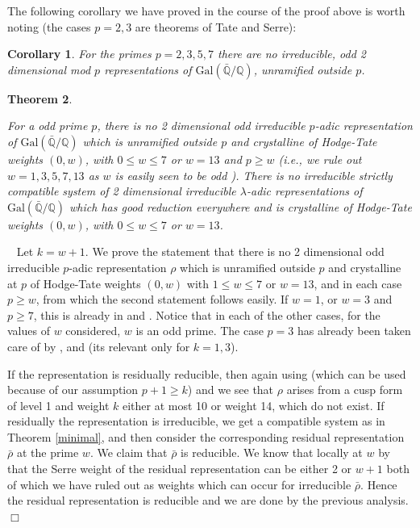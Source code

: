 \documentclass[12pt]{article}
\newtheorem{theorem}{Theorem}[section]
\newtheorem{cor}[theorem]{Corollary}
\newenvironment{proof}{\smallskip\noindent{\bf Proof.}\
}{$\Box$\smallskip\goodbreak}
\def\rhob{ {\bar {\rho} } }
\newcommand{\Galois}{\mathrm{Gal}}
\newcommand{\Gal}{\Galois( \bar{ {\mathbb Q}}/{\mathbb Q})}
\begin{document}
The following corollary we have proved in the course of the proof above is
worth
noting (the cases $p=2,3$ are theorems of Tate and Serre):

\begin{cor}\label{small}
For the primes $p=2,3,5,7$ there are no irreducible, odd
2 dimensional mod $p$ representations of $\Gal$, unramified outside $p$.

\end{cor}







\begin{theorem}\label{lowweight1}

 For a odd prime $p$, there is no 2 dimensional odd irreducible $p$-adic
representation of $\Gal$ which is unramified outside $p$ and crystalline
 of Hodge-Tate
weights $(0,w)$, with $0 \leq w \leq 7$ or $w=13$ and $p \geq w$
(i.e., we rule out
$w=1,3,5,7,13$ as $w$ is easily seen to be odd \cite{Wint}). 
There is no irreducible strictly compatible
system
of 2 dimensional irreducible $\lambda$-adic representations of $\Gal$
which has good reduction everywhere and is crystalline
of Hodge-Tate
weights $(0,w)$, with $0 \leq w \leq 7$ or $w=13$.

\end{theorem}

\begin{proof} Let $k=w+1$.
We prove the statement that
there is no 2 dimensional odd irreducible $p$-adic representation $\rho$
which is unramified outside $p$ and crystalline  at  $p$ of Hodge-Tate
weights $(0,w)$ with $1 \leq w \leq 7$ or $w=13$, and in each case $p \geq
w$,
from which the second statement follows easily.
If $w=1$, or $w=3$ and $p\geq 7$, this is already in \cite{D} and \cite{Wint}.
Notice that in each
of the other cases, for the values of $w$ considered, $w$ is an odd prime.
The case $p=3$ has already been taken care of 
by \cite{Serre2}, \cite{SW2} and \cite{BLZ}
(its relevant only for
$k=1,3$).

If the representation is residually reducible, then again using \cite{BLZ}
(which can
be used because of our assumption $p+1\geq k$)
and \cite{SW2} we see that $\rho$ arises from a  cusp form of level
1 and weight $k$ either
at most 10 or weight 14, which do not exist. If residually the
representation is
irreducible,
we get a compatible system as in Theorem \ref{minimal}, and then
consider the corresponding residual representation
$\rhob$ at the prime $w$. We claim that $\rhob$ is reducible. 
We know that locally
at $w$ by \cite{BLZ} that the Serre
weight of the residual representation
can be either 2 or $w+1$ both of which we have ruled out
as weights which can occur for irreducible
$\rhob$. Hence the residual representation is reducible
and we are done by the previous analysis.
\end{proof}
\end{document}
